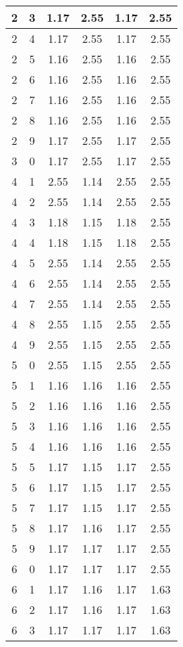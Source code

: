 \begin{longtable}{|c|c||c||c||c|c|}
	2 & 3 & 1.17 & 2.55 & 1.17 & 2.55 \\ \hline
	2 & 4 & 1.17 & 2.55 & 1.17 & 2.55 \\ \hline
	2 & 5 & 1.16 & 2.55 & 1.16 & 2.55 \\ \hline
	2 & 6 & 1.16 & 2.55 & 1.16 & 2.55 \\ \hline
	2 & 7 & 1.16 & 2.55 & 1.16 & 2.55 \\ \hline
	2 & 8 & 1.16 & 2.55 & 1.16 & 2.55 \\ \hline
	2 & 9 & 1.17 & 2.55 & 1.17 & 2.55 \\ \hline
	3 & 0 & 1.17 & 2.55 & 1.17 & 2.55 \\ \hline
	4 & 1 & 2.55 & 1.14 & 2.55 & 2.55 \\ \hline
	4 & 2 & 2.55 & 1.14 & 2.55 & 2.55 \\ \hline
	4 & 3 & 1.18 & 1.15 & 1.18 & 2.55 \\ \hline
	4 & 4 & 1.18 & 1.15 & 1.18 & 2.55 \\ \hline
	4 & 5 & 2.55 & 1.14 & 2.55 & 2.55 \\ \hline
	4 & 6 & 2.55 & 1.14 & 2.55 & 2.55 \\ \hline
	4 & 7 & 2.55 & 1.14 & 2.55 & 2.55 \\ \hline
	4 & 8 & 2.55 & 1.15 & 2.55 & 2.55 \\ \hline
	4 & 9 & 2.55 & 1.15 & 2.55 & 2.55 \\ \hline
	5 & 0 & 2.55 & 1.15 & 2.55 & 2.55 \\ \hline
	5 & 1 & 1.16 & 1.16 & 1.16 & 2.55 \\ \hline
	5 & 2 & 1.16 & 1.16 & 1.16 & 2.55 \\ \hline
	5 & 3 & 1.16 & 1.16 & 1.16 & 2.55 \\ \hline
	5 & 4 & 1.16 & 1.16 & 1.16 & 2.55 \\ \hline
	5 & 5 & 1.17 & 1.15 & 1.17 & 2.55 \\ \hline
	5 & 6 & 1.17 & 1.15 & 1.17 & 2.55 \\ \hline
	5 & 7 & 1.17 & 1.15 & 1.17 & 2.55 \\ \hline
	5 & 8 & 1.17 & 1.16 & 1.17 & 2.55 \\ \hline
	5 & 9 & 1.17 & 1.17 & 1.17 & 2.55 \\ \hline
	6 & 0 & 1.17 & 1.17 & 1.17 & 2.55 \\ \hline
	6 & 1 & 1.17 & 1.16 & 1.17 & 1.63 \\ \hline
	6 & 2 & 1.17 & 1.16 & 1.17 & 1.63 \\ \hline
	6 & 3 & 1.17 & 1.17 & 1.17 & 1.63 \\ \hline

\end{longtable}
